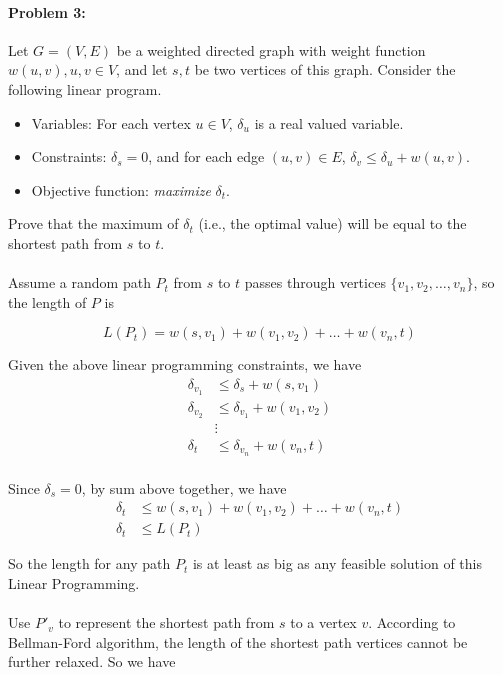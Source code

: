 \documentclass{article}
\begin{document}
\newpage
\paragraph{Problem 3:}
Let $G=(V,E)$ be a weighted directed graph with weight function $w(u,v), u,v \in V$, and let $s,t$ be two vertices of this graph. Consider the following linear program.
\begin{itemize}
    \item Variables: For each vertex $u \in V$, $\delta_u$ is a real valued variable.
    \item Constraints: $\delta_s=0$, and for each edge $(u,v) \in E$, $\delta_v \leq \delta_u + w(u,v)$.
    \item Objective function: \emph{maximize} $\delta_t$.
\end{itemize}
Prove that the maximum of $\delta_t$ (i.e., the optimal value) will be equal to the shortest path from $s$ to $t.$

\paragraph{}

Assume a random path $P_{t}$ from $s$ to $t$ passes through vertices $\{v_1, v_2, \dots, v_n\}$, so the length of $P$ is

$$L(P_{t}) = w(s, v_1) + w(v_1, v_2) + \dots + w(v_n, t)$$

Given the above linear programming constraints, we have
$$\begin{aligned}
\delta_{v_1} &\le \delta_s + w(s, v_1)\\
\delta_{v_2} &\le \delta_{v_1} + w(v_1, v_2)\\
&\vdots\\
\delta_{t} &\le \delta_{v_n} + w(v_n, t)\\
\end{aligned}$$

Since $\delta_s = 0$, by sum above together, we have
$$\begin{aligned}
\delta_{t} &\le w(s, v_1) + w(v_1, v_2) + \dots + w(v_n, t)\\
\delta_{t} &\le L(P_{t})
\end{aligned}$$

So the length for any path $P_{t}$ is at least as big as any feasible solution of this Linear Programming.

\paragraph{}
Use $P'_{v}$ to represent the shortest path from $s$ to a vertex $v$. According to Bellman-Ford algorithm, the length of the shortest path vertices cannot be further relaxed. So we have
\end{document}
